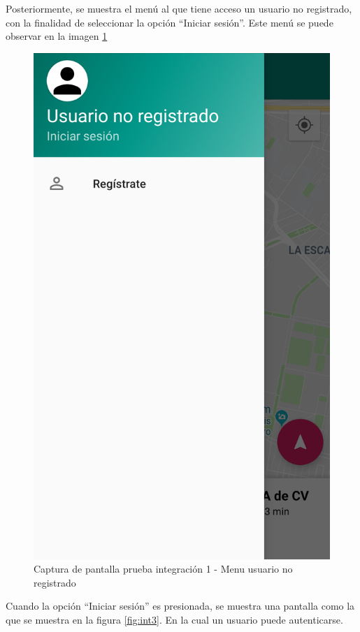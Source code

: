 Posteriormente, se muestra el menú al que tiene acceso un usuario no registrado, con la finalidad de seleccionar la opción ``Iniciar sesión''. Este menú se puede observar en la imagen \ref{fig:int2}

\begin{figure}[H]
	\centering
	\includegraphics[scale=.2]{Capitulo6/integracion/software/images/2}
	\caption{Captura de pantalla prueba integración 1 - Menu usuario no registrado}
	\label{fig:int2}
\end{figure}


Cuando la opción ``Iniciar sesión'' es presionada, se muestra una pantalla como la que se muestra en la figura \ref{fig:int3}. En la cual un usuario puede autenticarse.

